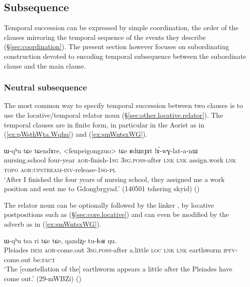  \subsection{Subsequence} 
Temporal succession can be expressed by simple coordination, the order of the clauses mirroring the temporal sequence of the events they describe (§\ref{sec:coordination}). The present section however focuses on subordinating construction devoted to encoding temporal subsequence between the subordinate clause and the main clause. 

 \subsubsection{Neutral subsequence} \label{sec:subsequence.neutral}
 The most common way to specify temporal succession between two clauses is to use the locative/temporal relator noun    (§\ref{sec:other.locative.relator}). The temporal clauses are in finite form, in particular in the Aorist as in (\ref{ex:pWsthWta.Wqhu}) and (\ref{ex:smWntsxWG}).
 
 
 \begin{exe}
\ex \label{ex:pWsthWta.Wqhu}
 ɯ-qʰu tɕe tɕendɤre, <fenpeigongzuo> tɕe ʁdɯrɟɤt lɤ́-wɣ-lat-a-nɯ \\
 nursing.school four-year \textsc{aor}-finish-\textsc{1sg} \textsc{3sg}.\textsc{poss}-after \textsc{lnk} \textsc{lnk} assign.work \textsc{lnk}  \textsc{topo} \textsc{aor}:\textsc{upstream}-\textsc{inv}-release-\textsc{1sg}-\textsc{pl} \\
 \glt `After I finished the four years of nursing school, they assigned me a work position and sent me to Gdongbrgyad.' (140501 tshering skyid)
 ()
 \end{exe}

The relator noun  can be optionally followed by the linker , by locative postpositions such as   (§\ref{sec:core.locative}) and can even be modified by the adverb  as in (\ref{ex:smWntsxWG}).

 \begin{exe}
\ex \label{ex:smWntsxWG}
 ɯ-qʰu tsa ri tɕe tɕe, qandʐe tu-ɬoʁ ŋu. \\
Pleiades \textsc{dem} \textsc{aor}-come.out \textsc{3sg}.\textsc{poss}-after a.little \textsc{loc} \textsc{lnk} \textsc{lnk} earthworm \textsc{ipfv}-come.out be:\textsc{fact} \\
 \glt  `The [constellation of the] earthworm appears a little after the Pleiades have come out.'  (29-mWBZi)
()
\end{exe}
 
